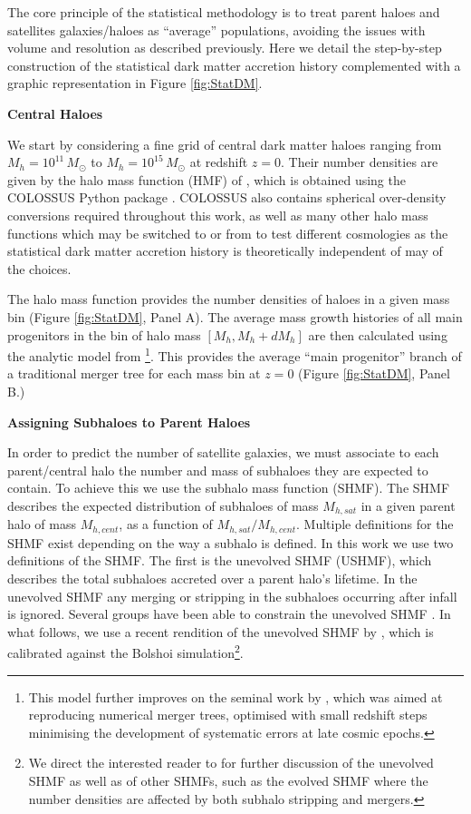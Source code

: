 The core principle of the statistical methodology is to treat parent haloes and satellites galaxies/haloes as ``average'' populations, avoiding the issues with volume and resolution as described previously. Here we detail the step-by-step construction of the statistical dark matter accretion history complemented with a graphic representation in Figure \ref{fig:StatDM}.

\textbf{Central Haloes}

We start by considering a fine grid of central dark matter haloes ranging from $M_{h}=10^{11}\, M_{\odot}$ to $M_{h}=10^{15}\, M_{\odot}$ at redshift $z=0$. Their number densities are given by the halo mass function (HMF) of \citet{Despali2016TheDefinitions}, which is obtained using the COLOSSUS Python package \citep{Diemer2018COLOSSUS:Halos}. COLOSSUS also contains spherical over-density conversions required throughout this work, as well as many other halo mass functions which may be switched to or from to test different cosmologies as the statistical dark matter accretion history is theoretically independent of may of the choices.

The halo mass function provides the number densities of haloes in a given mass bin (Figure \ref{fig:StatDM}, Panel A).
The average mass growth histories of all main progenitors in the bin of halo mass $[M_{h},M_{h}+dM_{h}]$ are then calculated using the analytic model from \citet{vandenBosch2014ComingWells}\footnote{This model further improves on the seminal work by \citet{Parkinson2008GeneratingTrees}, which was aimed at reproducing numerical merger trees, optimised with small redshift steps minimising the development of systematic errors at late cosmic epochs.}. This provides the average ``main progenitor'' branch of a traditional merger tree for each mass bin at $z = 0$ (Figure \ref{fig:StatDM}, Panel B.)

\textbf{Assigning Subhaloes to Parent Haloes}

In order to predict the number of satellite galaxies, we must associate to each parent/central halo the number and mass of subhaloes they are expected to contain. To achieve this we use the subhalo mass function (SHMF). The SHMF describes the expected distribution of subhaloes of mass $M_{h,sat}$ in a given parent halo of mass $M_{h,cent}$, as a function of $M_{h,sat}/M_{h,cent}$. Multiple definitions for the SHMF exist depending on the way a subhalo is defined. In this work we use two definitions of the SHMF. The first is the unevolved SHMF (USHMF), which describes the total subhaloes accreted over a parent halo's lifetime. In the unevolved SHMF any merging or stripping in the subhaloes occurring after infall is ignored. Several groups have been able to constrain the unevolved SHMF \citep{Giocoli2008AnalyticalHaloes,Jiang2016StatisticsFunctions}. In what follows, we use a recent rendition of the unevolved SHMF by \citet{Jiang2016StatisticsFunctions}, which is calibrated against the Bolshoi simulation\footnote{We direct the interested reader to \citet{Jiang2016StatisticsFunctions} for further discussion of the unevolved SHMF as well as of other SHMFs, such as the evolved SHMF where the number densities are affected by both subhalo stripping and mergers.}.

